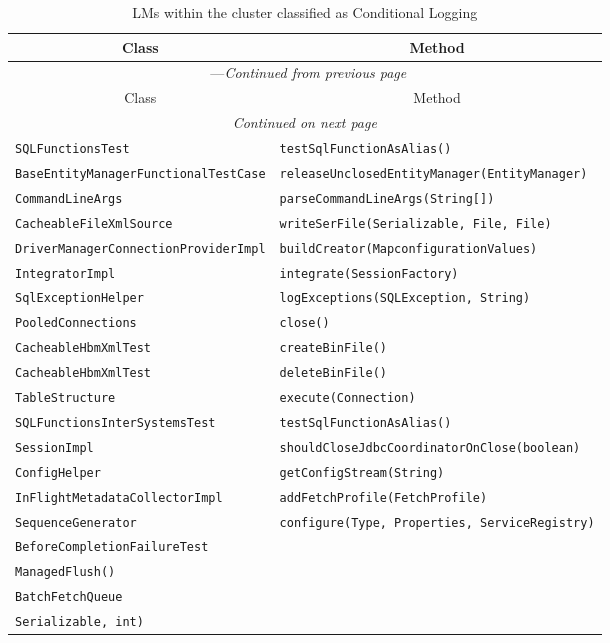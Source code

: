 \begin{center}
\begin{longtable}{ll}
\caption{LMs within the cluster classified as Conditional Logging}\\
\toprule\multicolumn{1}{c}{Class}&\multicolumn{1}{c}{Method}\\\midrule
\endfirsthead

\multicolumn{2}{c}{\tablename\ \thetable{}---\textit{Continued from previous page}} \\\midrule
\multicolumn{1}{c}{Class}&\multicolumn{1}{c}{Method}\\\midrule
\endhead
\multicolumn{2}{c}{\textit{Continued on next page}}\\\midrule
\endfoot
\bottomrule
\endlastfoot
\lstinline/SQLFunctionsTest/&{\lstinline/testSqlFunctionAsAlias()/}\\
\lstinline/BaseEntityManagerFunctionalTestCase/&{\lstinline/releaseUnclosedEntityManager(EntityManager)/}\\
\lstinline/CommandLineArgs/&{\lstinline/parseCommandLineArgs(String[])/}\\
\lstinline/CacheableFileXmlSource/&{\lstinline/writeSerFile(Serializable, File, File)/}\\
\lstinline/DriverManagerConnectionProviderImpl/&{\lstinline/buildCreator(MapconfigurationValues)/}\\
\lstinline/IntegratorImpl/&{\lstinline/integrate(SessionFactory)/}\\
\lstinline/SqlExceptionHelper/&{\lstinline/logExceptions(SQLException, String)/}\\
\lstinline/PooledConnections/&{\lstinline/close()/}\\
\lstinline/CacheableHbmXmlTest/&{\lstinline/createBinFile()/}\\
\lstinline/CacheableHbmXmlTest/&{\lstinline/deleteBinFile()/}\\
\lstinline/TableStructure/&{\lstinline/execute(Connection)/}\\
\lstinline/SQLFunctionsInterSystemsTest/&{\lstinline/testSqlFunctionAsAlias()/}\\
\lstinline/SessionImpl/&{\lstinline/shouldCloseJdbcCoordinatorOnClose(boolean)/}\\
\lstinline/ConfigHelper/&{\lstinline/getConfigStream(String)/}\\
\lstinline/InFlightMetadataCollectorImpl/&{\lstinline/addFetchProfile(FetchProfile)/}\\
\lstinline/SequenceGenerator/&{\lstinline/configure(Type, Properties, ServiceRegistry)/}\\
\lstinline/BeforeCompletionFailureTest/&\raisebox{-13pt}{\shortstack{\lstinline/testUniqueConstraintViolationDuring/-\\\lstinline/ManagedFlush()/}}\\
\lstinline/BatchFetchQueue/&\raisebox{-13pt}{\shortstack{\lstinline/getCollectionBatch(CollectionPersister,/\\\lstinline/Serializable, int)/}}\\
\end{longtable}
\end{center}

